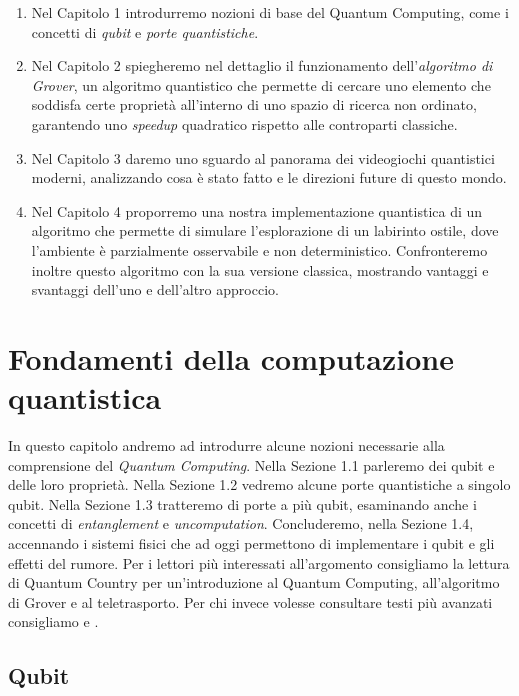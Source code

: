 \documentclass{book}
\theoremstyle{definition}
\theoremstyle{definition}
\theoremstyle{definition}
\theoremstyle{plain}
\theoremstyle{plain}
\theoremstyle{plain}
\theoremstyle{plain}
\begin{document}
\begin{enumerate}
    \item Nel Capitolo 1 introdurremo nozioni di base del Quantum Computing, come i concetti di \textit{qubit} e \textit{porte quantistiche}.
    \item Nel Capitolo 2 spiegheremo nel dettaglio il funzionamento dell'\textit{algoritmo di Grover}, un algoritmo quantistico che permette di cercare uno elemento che soddisfa certe proprietà all'interno di uno spazio di ricerca non ordinato, garantendo uno \textit{speedup} quadratico rispetto alle controparti classiche.
    \item Nel Capitolo 3 daremo uno sguardo al panorama dei videogiochi quantistici moderni, analizzando cosa è stato fatto e le direzioni future di questo mondo.
    \item Nel Capitolo 4 proporremo una nostra implementazione quantistica di un algoritmo che permette di simulare l'esplorazione di un labirinto ostile, dove l'ambiente è parzialmente osservabile e non deterministico. Confronteremo inoltre questo algoritmo con la sua versione classica, mostrando vantaggi e svantaggi dell'uno e dell'altro approccio.
\end{enumerate}

\mainmatter
\chapter{Fondamenti della computazione quantistica}
In questo capitolo andremo ad introdurre alcune nozioni necessarie alla comprensione del \emph{Quantum Computing}. Nella Sezione 1.1 parleremo dei qubit e delle loro proprietà. Nella Sezione 1.2 vedremo alcune porte quantistiche a singolo qubit. Nella Sezione 1.3 tratteremo di porte a più qubit, esaminando anche i concetti di \emph{entanglement} e \emph{uncomputation}. Concluderemo, nella Sezione 1.4, accennando i sistemi fisici che ad oggi permettono di implementare i qubit e gli effetti del rumore. Per i lettori più interessati all'argomento consigliamo la lettura di Quantum Country\cite{quantum_country} per un'introduzione al Quantum Computing, all'algoritmo di Grover e al teletrasporto. Per chi invece volesse consultare testi più avanzati consigliamo \cite{nielsen_chuang} e \cite{quantum_book_2}.

\section{Qubit}
\end{document}
